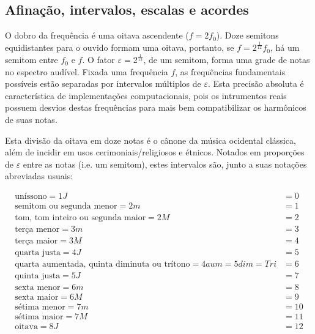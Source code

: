 \subsection{Afinação, intervalos, escalas e acordes}
O dobro da frequência é uma oitava ascendente ($f=2f_0$).
Doze semitons equidistantes para o ouvido formam uma oitava,
portanto, se $f=2^{\frac{1}{12}}f_0$, há um semitom entre $f_0$
e $f$.
O fator $\varepsilon=2^{\frac{1}{12}}$, de um semitom, forma uma grade de notas
no espectro audível. Fixada uma frequência $f$, as frequências fundamentais possíveis
estão separadas por intervalos múltiplos de $\varepsilon$.
Esta precisão absoluta é característica de implementações
computacionais, pois os intrumentos reais possuem desvios destas frequências para mais bem compatibilizar os harmônicos
de suas notas.\cite{Roederer}

Esta divisão da oitava em doze notas é o cânone da música ocidental clássica,
além de incidir em usos cerimoniais/religiosos e étnicos.\cite{Wisnick} Notados em proporções de $\varepsilon$ entre as notas (i.e. um semitom), estes intervalos são, junto a suas notações abreviadas usuais:

\begin{equation}
\begin{split}
\text{uníssono} = 1J & = 0 \\
\text{semitom ou segunda menor} =2m & = 1 \\
\text{tom, tom inteiro ou segunda maior} =2M & = 2 \\
\text{terça menor} = 3m & = 3 \\
\text{terça maior} = 3M & = 4 \\
\text{quarta justa} = 4J & = 5 \\
\text{quarta aumentada, quinta diminuta ou trítono} = 4aum = 5dim = Tri & = 6 \\
\text{quinta justa} = 5J & = 7 \\
\text{sexta menor} = 6m & = 8 \\
\text{sexta maior} = 6M & = 9 \\
\text{sétima menor} = 7m & = 10 \\
\text{sétima maior} = 7M & = 11 \\
\text{oitava} = 8J & = 12
\end{split}
\end{equation}

